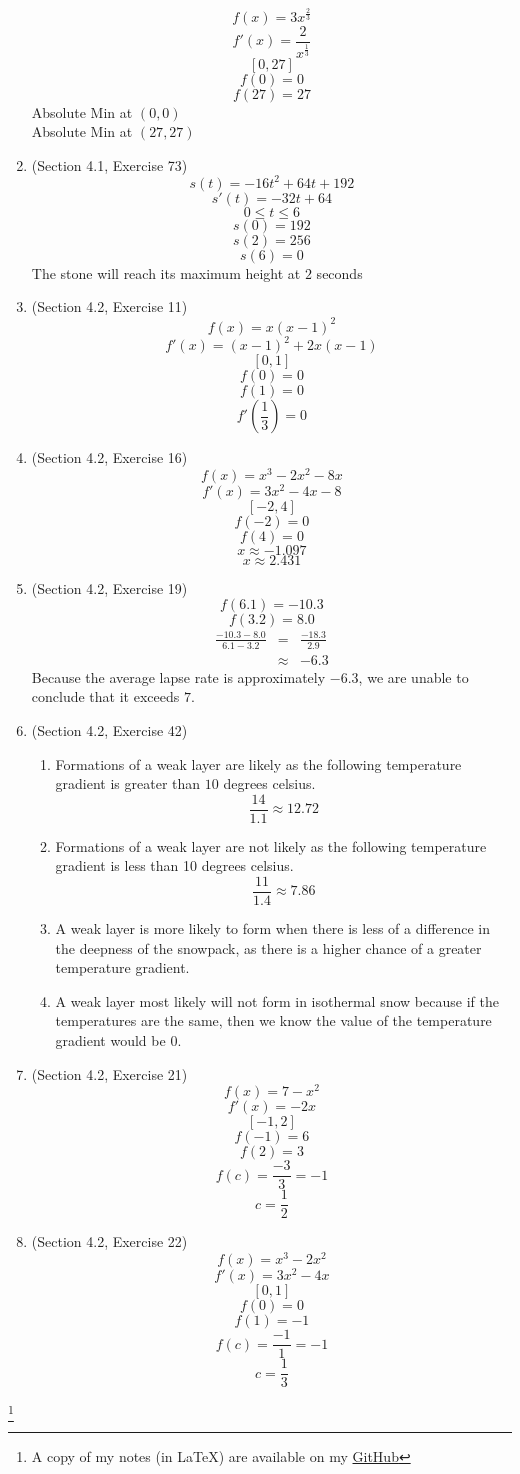 \documentclass{article}
\newcommand\blfootnote[1]{
    \begingroup
    \renewcommand\thefootnote{}\footnote{#1}
    \addtocounter{footnote}{-1}
    \endgroup
}
\begin{document}
\begin{enumerate}
        $$f(x) = 3x^{\frac{2}{3}}$$
        $$f'(x) = \frac{2}{x^{\frac{1}{3}}}$$
        $$[0, 27]$$
        $$f(0) = 0$$
        $$f(27) = 27$$
        Absolute Min at $(0, 0)$ \\
        Absolute Min at $(27, 27)$
    \item (Section 4.1, Exercise 73)
        $$s(t) = -16t^2 + 64t + 192$$
        $$s'(t) = -32t + 64$$
        $$0 \leq t \leq 6$$
        $$s(0) = 192$$
        $$s(2) = 256$$
        $$s(6) = 0$$
        The stone will reach its maximum height at $2$ seconds
    \item (Section 4.2, Exercise 11)
        $$f(x) = x\left(x - 1\right)^2$$
        $$f'(x) = \left(x - 1\right)^2 + 2x\left(x - 1\right)$$
        $$[0, 1]$$
        $$f(0) = 0$$
        $$f(1) = 0$$
        $$f'\left(\frac{1}{3}\right) = 0$$
    \item (Section 4.2, Exercise 16)
        $$f(x) = x^3 - 2x^2 - 8x$$
        $$f'(x) = 3x^2 - 4x - 8$$
        $$[-2, 4]$$
        $$f(-2) = 0$$
        $$f(4) = 0$$
        $$x \approx -1.097$$
        $$x \approx 2.431$$
    \item (Section 4.2, Exercise 19)
        $$f(6.1) = -10.3$$
        $$f(3.2) = 8.0$$
        \begin{eqnarray}
            \frac{-10.3 - 8.0}{6.1 - 3.2} &=& \frac{-18.3}{2.9} \\
                                          &\approx& -6.3
        \end{eqnarray}
        Because the average lapse rate is approximately $-6.3$, we are unable to conclude that it exceeds $7$.
    \item (Section 4.2, Exercise 42)
        \begin{enumerate}
            \item Formations of a weak layer are likely as the following temperature gradient is greater than $10$ degrees celsius.
                $$\frac{14}{1.1} \approx 12.72$$
            \item Formations of a weak layer are not likely as the following temperature gradient is less than 10 degrees celsius.
                $$\frac{11}{1.4} \approx 7.86$$
            \item A weak layer is more likely to form when there is less of a difference in the deepness of the snowpack, as there is a higher chance of a greater temperature gradient.
            \item A weak layer most likely will not form in isothermal snow because if the temperatures are the same, then we know the value of the temperature gradient would be $0$.
        \end{enumerate}
    \item (Section 4.2, Exercise 21)
        $$f(x) = 7 - x^2$$
        $$f'(x) = -2x$$
        $$[-1, 2]$$
        $$f(-1) = 6$$
        $$f(2) = 3$$
        $$f(c) = \frac{-3}{3} = -1$$
        $$c = \frac{1}{2}$$
    \item (Section 4.2, Exercise 22)
        $$f(x) = x^3 - 2x^2$$
        $$f'(x) = 3x^2 - 4x$$
        $$[0, 1]$$
        $$f(0) = 0$$
        $$f(1) = -1$$
        $$f(c) = \frac{-1}{1} = -1$$
        $$c = \frac{1}{3}$$
\end{enumerate}

\blfootnote{A copy of my notes (in \LaTeX) are available on my \href{https://github.com/onlinechronically/MATH-211}{GitHub}}
\end{document}
